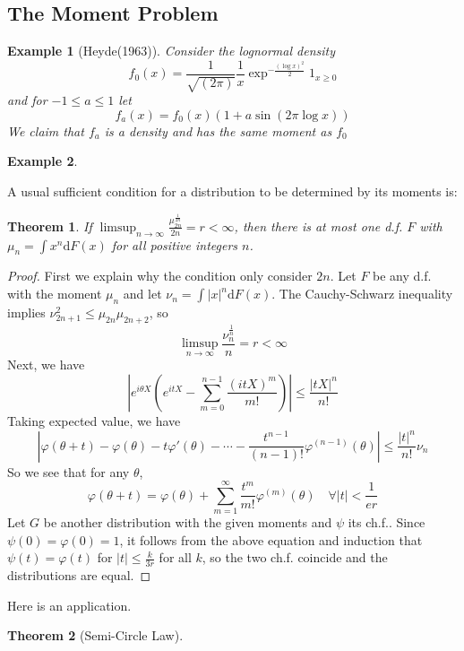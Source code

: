 \documentclass{article}
\newtheorem{Thm}{Theorem}[section]
\newtheorem{Eg}{Example}[section]
\theoremstyle{definition}
\begin{document}
\subsection{The Moment Problem}
\begin{Eg}[Heyde(1963)]
    Consider the lognormal density \[f_0(x)=\frac{1}{\sqrt{(2\pi)}}\frac{1}{x}\exp^{-\frac{(\log x)^2}{2}}1_{x\ge 0}\] 
    and for $-1\le a\le 1$ let \[f_a(x)=f_0(x)(1+a\sin(2\pi\log x))\]
    We claim that $f_a$ is a density and has the same moment as $f_0$
\end{Eg}
\begin{Eg}
    
\end{Eg}
A usual sufficient condition for a distribution to be determined by its moments is:
\begin{Thm}
    If $\limsup_{n\to\infty}\frac{\mu_{2n}^{\frac{1}{2n}}}{2n}=r<\infty$, then there is at most one d.f. $F$ with
    $\mu_n=\int x^n\mathrm{d}F(x)$ for all positive integers $n$.
\end{Thm}
\begin{proof}
    First we explain why the condition only consider $2n$. Let $F$ be any d.f. with the moment $\mu_n$ and let $\nu_n=\int\left|x\right|^n\mathrm{d}F(x)$.
    The Cauchy-Schwarz inequality implies $\nu_{2n+1}^2\le \mu_{2n}\mu_{2n+2}$, so \[\limsup_{n\to\infty}\frac{\nu_{n}^{\frac{1}{n}}}{n}=r<\infty\]
    Next, we have \[\left|e^{i\theta X}(e^{itX}-\sum_{m=0}^{n-1}\frac{(itX)^m}{m!})\right|\le \frac{\left|tX\right|^n}{n!}\]
    Taking expected value, we have \[\left|\varphi(\theta+t)-\varphi(\theta)-t\varphi'(\theta)-\cdots-\frac{t^{n-1}}{(n-1)!}\varphi^{(n-1)}(\theta)\right|\le \frac{\left|t\right|^n}{n!}\nu_n\]
    So we see that for any $\theta$, \[\varphi(\theta+t)=\varphi(\theta)+\sum_{m=1}^\infty\frac{t^m}{m!}\varphi^{(m)}(\theta)\quad\forall\left|t\right|<\frac{1}{er}\]
    Let $G$ be another distribution with the given moments and $\psi$ its ch.f.. Since $\psi(0)=\varphi(0)=1$, it follows from the above equation and induction that $\psi(t)=\varphi(t)$ for $\left|t\right|\le \frac{k}{3r}$ for all $k$,
    so the two ch.f. coincide and the distributions are equal.
\end{proof}
Here is an application.
\begin{Thm}[Semi-Circle Law]
    
\end{Thm}
\end{document}
